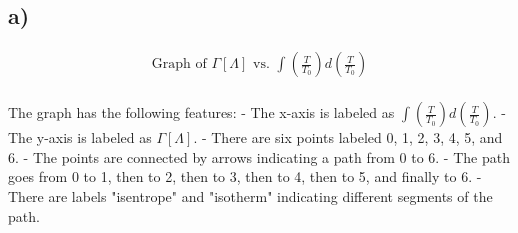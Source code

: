 

\subsection*{a)}

\[
\begin{array}{c}
\text{Graph of } \Gamma [\Lambda] \text{ vs. } \int \left( \frac{T}{T_0} \right) d\left( \frac{T}{T_0} \right) \\
\end{array}
\]

\noindent
The graph has the following features:
- The x-axis is labeled as $\int \left( \frac{T}{T_0} \right) d\left( \frac{T}{T_0} \right)$.
- The y-axis is labeled as $\Gamma [\Lambda]$.
- There are six points labeled 0, 1, 2, 3, 4, 5, and 6.
- The points are connected by arrows indicating a path from 0 to 6.
- The path goes from 0 to 1, then to 2, then to 3, then to 4, then to 5, and finally to 6.
- There are labels "isentrope" and "isotherm" indicating different segments of the path.
